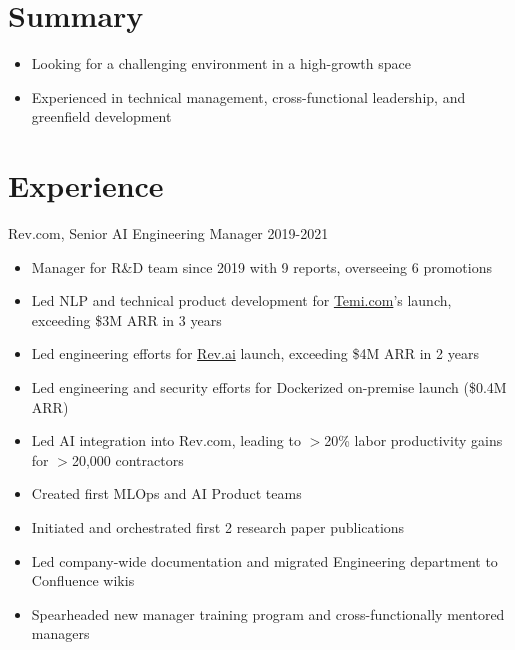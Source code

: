 \documentclass[line,margin]{res}
\begin{document}
    \address{\href{mailto:jdong42@gmail.com}{jdong42@gmail.com}}
    \address{\href{tel:15127759524}{(512) 775-9524}}
\begin{resume}

\vspace{-8pt}
\section{Summary}
    \vspace{22pt}
        \begin{itemize} \itemsep -2pt
        \item Looking for a challenging environment in a high-growth space
        \item Experienced in technical management, cross-functional leadership, and greenfield development
        \end{itemize}

\vspace{-8pt}
\section{Experience} 
    \vspace{12pt}
    Rev.com, Senior AI Engineering Manager
    \hfill  2019-2021
        \begin{itemize} \itemsep -2pt
        \item Manager for R\&D team since 2019 with 9 reports, overseeing 6 promotions
        \item Led NLP and technical product development for \href{https://temi.com}{Temi.com}'s launch, exceeding \$3M ARR in 3 years
        \item Led engineering efforts for \href{https://rev.ai}{Rev.ai} launch, exceeding \$4M ARR in 2 years
        \item Led engineering and security efforts for Dockerized on-premise launch (\$0.4M ARR)
        \item Led AI integration into Rev.com, leading to $>$20\% labor productivity gains for $>$20,000 contractors
        \item Created first MLOps and AI Product teams
        \item Initiated and orchestrated first 2 research paper publications
        \item Led company-wide documentation and migrated Engineering department to Confluence wikis
        \item Spearheaded new manager training program and cross-functionally mentored managers
        \end{itemize}
        

\end{resume}
\end{document}
